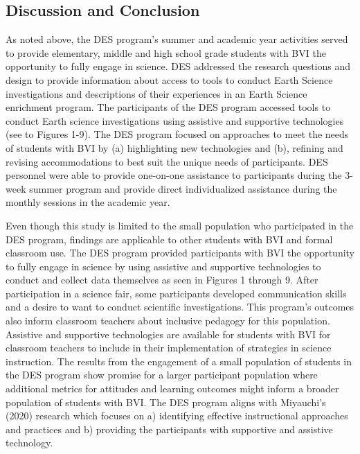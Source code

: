 \documentclass[11pt]{sig-alternate}
\begin{document}
\begin{large}
\section*{Discussion and Conclusion}

As noted above, the DES program’s summer and academic year activities served to provide elementary, middle and high school grade students with BVI the opportunity to fully engage in science. DES addressed the research questions and design to provide information about access to tools to conduct Earth Science investigations and descriptions of their experiences in an Earth Science enrichment program. The participants of the DES program accessed tools to conduct Earth science investigations using assistive and supportive technologies (see to Figures 1-9).  The DES program focused on approaches to meet the needs of students with BVI by (a) highlighting new technologies and (b), refining and revising accommodations to best suit the unique needs of participants. DES personnel were able to provide one-on-one assistance to participants during the 3-week summer program and provide direct individualized assistance during the monthly sessions in the academic year. 

Even though this study is limited to the small population who participated in the DES program, findings are applicable to other students with BVI and formal classroom use. The DES program provided participants with BVI the opportunity to fully engage in science by using assistive and supportive technologies to conduct and collect data themselves as seen in Figures 1 through 9.  After participation in a science fair, some participants developed communication skills and a desire to want to conduct scientific investigations.  This program’s outcomes also inform classroom teachers about inclusive pedagogy for this population.  Assistive and supportive technologies are available for students with BVI for classroom teachers to include in their implementation of strategies in science instruction. The results from the engagement of a small population of students in the DES program show promise for a larger participant population where additional metrics for attitudes and learning outcomes might inform a broader population of students with BVI. The DES program aligns with Miyauchi’s (2020) research which focuses on a) identifying effective instructional approaches and practices and b) providing the participants with supportive and assistive technology. 


\end{large}
\end{document}
